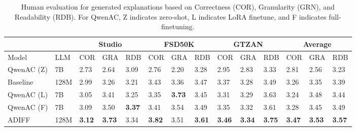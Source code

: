 \begin{table}
\scriptsize
\centering
\begin{tabular}{l|l|lll|lll|lll|lll} 
\toprule
 & & \multicolumn{3}{c|}{Studio} & \multicolumn{3}{c|}{FSD50K} & \multicolumn{3}{c}{GTZAN} & \multicolumn{3}{|c}{Average}\\
\midrule
\quad Model & LLM & COR & GRA & RDB & COR & GRA & RDB  & COR & GRA & RDB & COR & GRA & RDB \\
\midrule
QwenAC (Z) & 7B & 2.73 & 2.64 & 3.09 & 2.76 & 2.20 & 3.28 & 2.95 & 2.83 & 3.33 & 2.81 & 2.56 & 3.23 \\
Baseline & 128M & 2.99 & 3.26 & 3.21 & 3.43 & 3.36 & 3.47 & 3.37 & 3.28 & 3.49 & 3.26 & 3.35 & 3.39 \\
QwenAC (L) & 7B & 3.05& 3.41& 3.25& 3.35& \textbf{3.73} & 3.45& 3.31& 3.29& 3.63& 3.24& 3.48& 3.44 \\
QwenAC (F) & 7B & 3.09 & 3.50 &\textbf{3.37}& 3.41& 3.54& 3.49& 3.35& 3.32& 3.61& 3.28& 3.45& 3.49 \\ \midrule
\rowcolor[HTML]{EFEFEF} ADIFF & 128M & \textbf{3.12} & \textbf{3.73} & 3.34 & \textbf{3.82} & 3.51 & \textbf{3.61} & \textbf{3.46} & \textbf{3.34} & \textbf{3.75} & \textbf{3.47} & \textbf{3.53} & \textbf{3.57} \\
\bottomrule
\end{tabular}
\caption{\small Human evaluation for generated explanations based on Correctness (COR), Granularity (GRN), and Readability (RDB). For QwenAC, Z indicates zero-shot, L indicates LoRA finetune, and F indicates full-finetuning. \vspace{-0.2in}}
\label{table:human_evaluation_study}
\vspace{-0.1in}
\end{table}